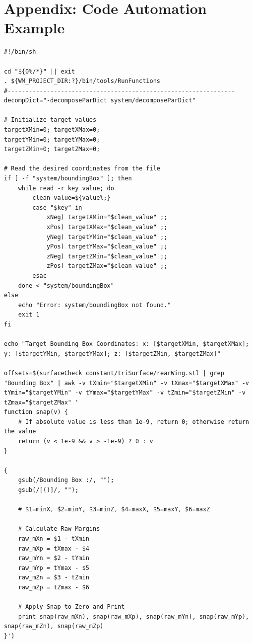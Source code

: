 \documentclass[12pt,a4paper]{article}
\begin{document}
\section*{Appendix: Code Automation Example}
\label{appendix:code_auto_example}
\lstset{language=bash, breaklines=true, basicstyle=\ttfamily\small, frame=single, numbers=left, stepnumber=1, showstringspaces=false, tabsize=4, breakatwhitespace=false}
\begin{lstlisting}
#!/bin/sh

cd "${0%/*}" || exit
. ${WM_PROJECT_DIR:?}/bin/tools/RunFunctions
#----------------------------------------------------------------
decompDict="-decomposeParDict system/decomposeParDict"

# Initialize target values
targetXMin=0; targetXMax=0; 
targetYMin=0; targetYMax=0; 
targetZMin=0; targetZMax=0;

# Read the desired coordinates from the file
if [ -f "system/boundingBox" ]; then
    while read -r key value; do
        clean_value=${value%;}
        case "$key" in
            xNeg) targetXMin="$clean_value" ;;
            xPos) targetXMax="$clean_value" ;;
            yNeg) targetYMin="$clean_value" ;;
            yPos) targetYMax="$clean_value" ;;
            zNeg) targetZMin="$clean_value" ;;
            zPos) targetZMax="$clean_value" ;;
        esac
    done < "system/boundingBox"
else
    echo "Error: system/boundingBox not found."
    exit 1
fi

echo "Target Bounding Box Coordinates: x: [$targetXMin, $targetXMax]; y: [$targetYMin, $targetYMax]; z: [$targetZMin, $targetZMax]"

offsets=$(surfaceCheck constant/triSurface/rearWing.stl | grep "Bounding Box" | awk -v tXmin="$targetXMin" -v tXmax="$targetXMax" -v tYmin="$targetYMin" -v tYmax="$targetYMax" -v tZmin="$targetZMin" -v tZmax="$targetZMax" '
function snap(v) {
    # If absolute value is less than 1e-9, return 0; otherwise return the value
    return (v < 1e-9 && v > -1e-9) ? 0 : v
}

{
    gsub(/Bounding Box :/, "");
    gsub(/[()]/, "");
    
    # $1=minX, $2=minY, $3=minZ, $4=maxX, $5=maxY, $6=maxZ

    # Calculate Raw Margins
    raw_mXn = $1 - tXmin
    raw_mXp = tXmax - $4
    raw_mYn = $2 - tYmin
    raw_mYp = tYmax - $5
    raw_mZn = $3 - tZmin
    raw_mZp = tZmax - $6

    # Apply Snap to Zero and Print
    print snap(raw_mXn), snap(raw_mXp), snap(raw_mYn), snap(raw_mYp), snap(raw_mZn), snap(raw_mZp)
}')


\end{lstlisting}
\end{document}
